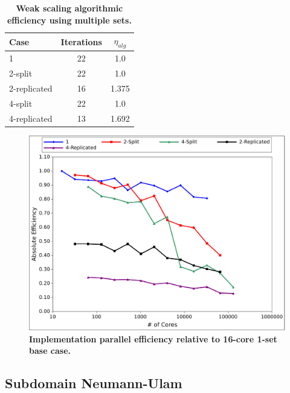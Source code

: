 \begin{table}[h!]
  \begin{center}
    \begin{tabular}{lcc}\hline\hline
      \multicolumn{1}{l}{Case}& 
      \multicolumn{1}{c}{Iterations}&
      \multicolumn{1}{c}{$\eta_{alg}$} \\\hline
      1 & 22 & 1.0 \\
      2-split & 22 & 1.0 \\
      2-replicated & 16 & 1.375 \\
      4-split & 22 & 1.0 \\
      4-replicated & 13 & 1.692 \\
      \hline\hline
    \end{tabular}
  \end{center}
  \caption{\textbf{Weak scaling algorithmic efficiency using multiple
      sets.}}
  \label{tab:ms_weak_alg_eff}
\end{table}

\begin{figure}[t!]
  \begin{center}
    \includegraphics[width=6in]{chapters/parallel_mc/titan_weak_ms_impeff.pdf}
  \end{center}
  \caption{\textbf{Implementation parallel efficiency relative to 16-core
      1-set base case.}}
  \label{fig:titan_weak_ms_impeff}
\end{figure}

\clearpage

\subsection{Subdomain Neumann-Ulam}
\label{subsec:full_clip}

